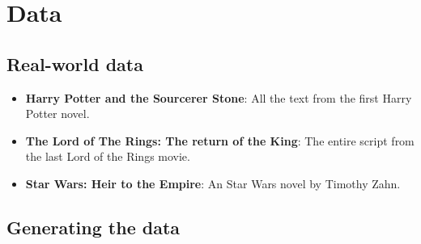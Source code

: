 \documentclass[12pt]{article}
\begin{document}




\section{Data} %

\subsection{Real-world data}
\begin{itemize}
\item \textbf{Harry Potter and the Sourcerer Stone}: All the text from the first Harry Potter novel.
\item \textbf{The Lord of The Rings: The return of the King}: The entire script from the last Lord of the Rings movie.
\item \textbf{Star Wars: Heir to the Empire}:  An Star Wars novel by Timothy Zahn. 
\end{itemize}

\subsection{Generating the data}
\end{document}
